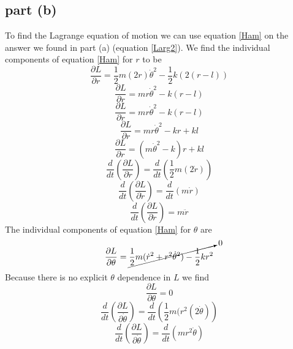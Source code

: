 \documentclass[11pt]{article}
\numberwithin{equation}{section}
\newcommand{\partdr}{\frac{\partial L}{\partial \dot{r}}}
\newcommand{\partr}{\frac{\partial L}{\partial r}}
\newcommand{\partdth}{\frac{\partial L}{\partial \dot{\theta}}}
\newcommand{\partth}{\frac{\partial L}{\partial \theta}}
\begin{document}
\subsection{part (b)}
To find the Lagrange equation of motion we can use equation \ref{Ham} on the answer we found in part (a) (equation \ref{Larg2}). We find the individual components of equation \ref{Ham} for $r$ to be
$$\partr = \frac{1}{2}m(2r)\dot{\theta}^2 - \frac{1}{2}k(2(r-l))$$
$$\partr = mr\dot{\theta}^2 - k(r-l)$$
$$\partr = mr\dot{\theta}^2 - k(r-l)$$
$$\partr = mr\dot{\theta}^2 - kr + kl$$
\begin{equation}
\partr = (m\dot{\theta}^2 - k)r + kl
\label{dLdr}
\end{equation}
$$\frac{d}{dt}\left(\partdr\right) = \frac{d}{dt}\left(\frac{1}{2}m(2\dot{r})\right)$$
$$\frac{d}{dt}\left(\partdr\right) = \frac{d}{dt}\left(m\dot{r}\right)$$
\begin{equation}
\frac{d}{dt}\left(\partdr\right) = m\ddot{r}
\label{dLddr}
\end{equation}
The individual components of equation \ref{Ham} for $\theta$ are
$$\partth = \cancelto{0}{\frac{1}{2}m(\dot{r}^2 + r^2\dot{\theta}^2) - \frac{1}{2}kr^2}$$
Because there is no explicit $\theta$ dependence in $L$ we find
\begin{equation}
\partth = 0
\label{dLdth}
\end{equation}
$$\frac{d}{dt}\left(\partdth\right) = \frac{d}{dt}\left(\frac{1}{2}m(r^2(2\dot{\theta})\right)$$
\begin{equation}
\frac{d}{dt}\left(\partdth\right) = \frac{d}{dt}\left(mr^2\dot{\theta}\right)
\label{dLddth}
\end{equation}
\end{document}
